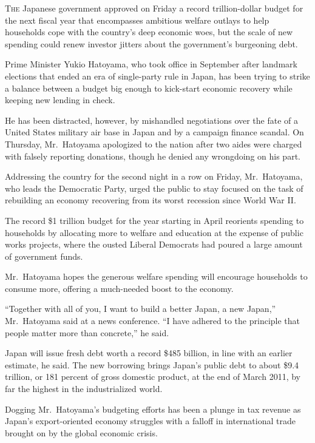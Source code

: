 ﻿\documentclass[12pt]{article}
\begin{document}
\lettrine{T}{he} Japanese government approved on Friday a record
trillion-dollar budget for the next fiscal year that encompasses ambitious welfare outlays to help
households cope with the country's deep economic woes, but the scale of new spending could renew
investor jitters about the government's burgeoning debt.

Prime Minister Yukio Hatoyama, who took office in September after landmark elections that ended an
era of single-party rule in Japan, has been trying to strike a balance between a budget big enough
to kick-start economic recovery while keeping new lending in check.

He has been distracted, however, by mishandled negotiations over the fate of a United States
military air base in Japan and by a campaign finance scandal. On Thursday, Mr.~Hatoyama apologized
to the nation after two aides were charged with falsely reporting donations, though he denied any
wrongdoing on his part.

Addressing the country for the second night in a row on Friday, Mr.~Hatoyama, who leads the
Democratic Party, urged the public to stay focused on the task of rebuilding an economy recovering
from its worst recession since World War II.

The record \$1 trillion budget for the year starting in April reorients spending to households by
allocating more to welfare and education at the expense of public works projects, where the ousted
Liberal Democrats had poured a large amount of government funds.

Mr.~Hatoyama hopes the generous welfare spending will encourage households to consume more, offering
a much-needed boost to the economy.

``Together with all of you, I want to build a better Japan, a new Japan,'' Mr.~Hatoyama said at a
news conference. ``I have adhered to the principle that people matter more than concrete,'' he said.

Japan will issue fresh debt worth a record \$485 billion, in line with an earlier estimate, he said.
The new borrowing brings Japan's public debt to about \$9.4 trillion, or 181 percent of gross
domestic product, at the end of March 2011, by far the highest in the industrialized world.

Dogging Mr.~Hatoyama's budgeting efforts has been a plunge in tax revenue as Japan's export-oriented
economy struggles with a falloff in international trade brought on by the global economic crisis.
\end{document}
